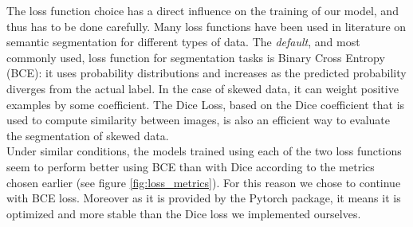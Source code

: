 \documentclass[10pt,conference,compsocconf]{IEEEtran}
\begin{document}
The loss function choice has a direct influence on the training of our model, and thus has to be done carefully. Many loss functions have been used in literature on semantic segmentation \cite{loss_functions} for different types of data. The \emph{default}, and most commonly used, loss function for segmentation tasks is Binary Cross Entropy (BCE): it uses probability distributions and increases as the predicted probability diverges from the actual label. In the case of skewed data, it can weight positive examples by some coefficient. The Dice Loss, based on the Dice coefficient that is used to compute similarity between images, is also an efficient way to evaluate the segmentation of skewed data. \\

Under similar conditions, the models trained using each of the two loss functions seem to perform better using BCE than with Dice according to the metrics chosen earlier (see figure \ref{fig:loss_metrics}). For this reason we chose to continue with BCE loss. Moreover as it is provided by the Pytorch package, it means it is optimized and more stable than the Dice loss we implemented ourselves.  
\end{document}

